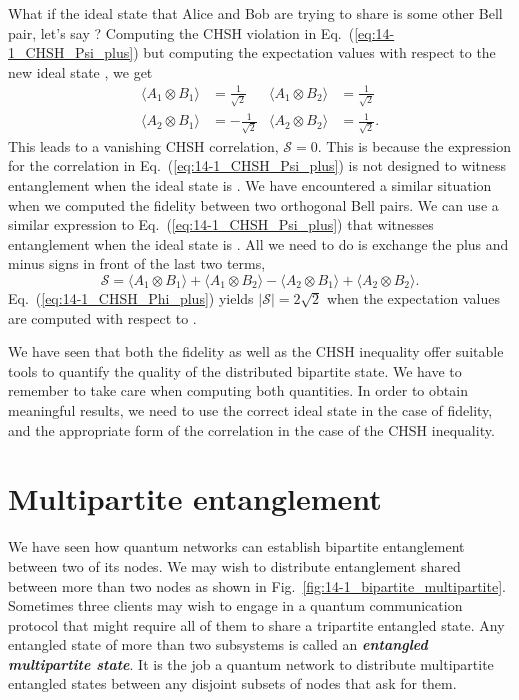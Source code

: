 What if the ideal state that Alice and Bob are trying to share is some other Bell pair, let's say \ket{\Phi^+}?
Computing the CHSH violation in Eq.~(\ref{eq:14-1_CHSH_Psi_plus}) but computing the expectation values with respect to the new ideal state \ket{\Phi^+}, we get
\begin{align}
    \langle A_1 \otimes B_1 \rangle & = \frac{1}{\sqrt{2}} & \langle A_1 \otimes B_2 \rangle & = \frac{1}{\sqrt{2}} \\
    \langle A_2 \otimes B_1 \rangle & = - \frac{1}{\sqrt{2}} & \langle A_2 \otimes B_2 \rangle & = \frac{1}{\sqrt{2}}.
\end{align}
This leads to a vanishing CHSH correlation, $\mathcal{S} = 0$.
This is because the expression for the correlation in Eq.~(\ref{eq:14-1_CHSH_Psi_plus}) is not designed to witness entanglement when the ideal state is \ket{\Phi^+}.
We have encountered a similar situation when we computed the fidelity between two orthogonal Bell pairs.
We can use a similar expression to Eq.~(\ref{eq:14-1_CHSH_Psi_plus}) that witnesses entanglement when the ideal state is \ket{\Phi^+}.
All we need to do is exchange the plus and minus signs in front of the last two terms,
\begin{equation}
    \mathcal{S} = \langle A_1 \otimes B_1\rangle + \langle A_1 \otimes B_2\rangle - \langle A_2 \otimes B_1\rangle + \langle A_2 \otimes B_2\rangle.
    \label{eq:14-1_CHSH_Phi_plus}
\end{equation}
Eq.~(\ref{eq:14-1_CHSH_Phi_plus}) yields $|\mathcal{S}| = 2\sqrt{2}$ when the expectation values are computed with respect to \ket{\Phi^+}.

We have seen that both the fidelity as well as the CHSH inequality offer suitable tools to quantify the quality of the distributed bipartite state.
We have to remember to take care when computing both quantities.
In order to obtain meaningful results, we need to use the correct ideal state in the case of fidelity, and the appropriate form of the correlation in the case of the CHSH inequality.



\section{Multipartite entanglement}
\label{sec:14-2_multipartite}

We have seen how quantum networks can establish bipartite entanglement between two of its nodes.
We may wish to distribute entanglement shared between more than two nodes as shown in Fig.~\ref{fig:14-1_bipartite_multipartite}.
Sometimes three clients may wish to engage in a quantum communication protocol that might require all of them to share a tripartite entangled state.
Any entangled state of more than two subsystems is called an \textit{\textbf{entangled multipartite state}}.
It is the job a quantum network to distribute multipartite entangled states between any disjoint subsets of nodes that ask for them.

